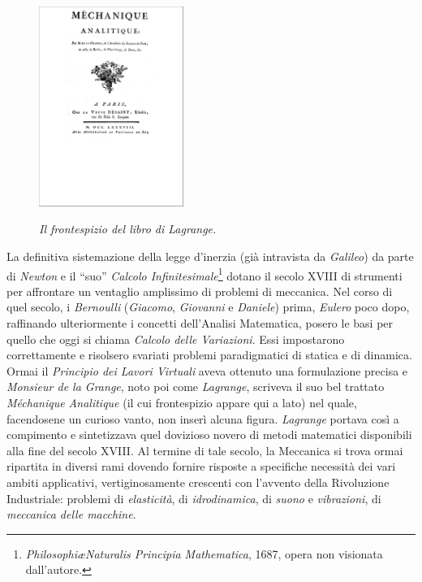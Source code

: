 \begin{figure}
	  \begin{center}
	  \includegraphics[width=0.42\textwidth]{part0/FIG/mechanique.pdf}
	  \end{center}

	  {\em Il frontespizio del libro di Lagrange.}
\end{figure}
\noindent La definitiva sistemazione della legge d'inerzia (gi\`a intravista da
{\em Galileo}) da parte di {\em Newton} e il ``suo''
{\em Calcolo Infinitesimale}\footnote{
{\em Philosophi\ae Naturalis Principia Mathematica}, 1687, opera non visionata dall'autore.
}
dotano il secolo XVIII di strumenti per affrontare un ventaglio amplissimo
di problemi di meccanica. Nel corso di quel secolo, i
{\em Bernoulli} ({\em Giacomo}, {\em Giovanni} e {\em Daniele})
prima, {\em Eulero}  poco dopo, raffinando ulteriormente 
i concetti dell'Analisi Matematica,
posero le basi per quello che oggi si chiama
{\em Calcolo delle Variazioni}. Essi impostarono 
correttamente e risolsero svariati
problemi paradigmatici di statica e di dinamica. Ormai il {\em Principio dei Lavori
Virtuali} aveva ottenuto una formulazione precisa e {\em Monsieur de la Grange}, noto
poi come {\em Lagrange}, scriveva il suo bel trattato {\em M\'echanique Analitique}
(il cui frontespizio appare qui a lato) nel
quale, facendosene un curioso vanto, non inser\`i alcuna figura.
{\em Lagrange} portava cos\`i a compimento e sintetizzava  quel dovizioso
novero di metodi matematici disponibili  
alla fine del secolo XVIII.
Al termine di tale secolo, la Meccanica si trova ormai ripartita
in diversi rami dovendo fornire risposte a specifiche
necessit\`a dei vari ambiti applicativi, vertiginosamente
crescenti con l'avvento della Rivoluzione Industriale:
problemi di
{\em elasticit\`a}, di {\em idrodinamica}, di {\em suono} e {\em vibrazioni}, di
{\em meccanica delle macchine}. 

